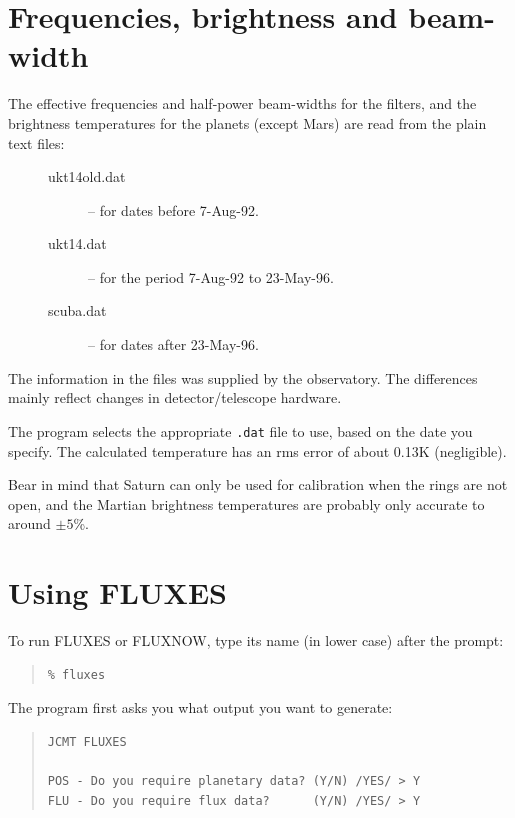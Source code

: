 \documentclass[11pt,twoside]{article}
\newenvironment{myquote}{\begin{quote}\begin{small}}{\end{small}\end{quote}}
\newcommand{\xlabel}[1]{}
\renewcommand{\_}{\texttt{\symbol{95}}}
\begin{document}
\section{Frequencies, brightness and beam-width}
\xlabel{FREQ}
\label{sec:freq}

The effective frequencies and half-power beam-widths for the filters, and the
brightness temperatures for the planets (except Mars) are read from the plain
text files:

\begin{description}
\item[\mbox{}]\mbox{}
\begin{description}
\item [ukt14\_old.dat] -- for dates before 7-Aug-92.
\item [ukt14.dat] -- for the period 7-Aug-92 to 23-May-96.
\item [scuba.dat] -- for dates after 23-May-96.
\end{description}
\end{description}

The information in the files was supplied by the observatory.
The differences mainly reflect changes in detector/telescope hardware.

The program selects the appropriate {\tt{.dat}} file to use, based on the date
you specify.
The calculated temperature has an rms error of about 0.13K (negligible).

Bear in mind that Saturn can only be used for calibration when the
rings are not open, and the Martian brightness temperatures are probably
only accurate to around $\pm5$\%.

\section{Using FLUXES}
\xlabel{USING}
\label{sec:using}

To run FLUXES or FLUXNOW, type its name (in lower case) after the prompt:

\begin{myquote}
\begin{verbatim}
% fluxes
\end{verbatim}
\end{myquote}

The program first asks you what output you want to generate:

\begin{myquote}
\begin{verbatim}
JCMT FLUXES

POS - Do you require planetary data? (Y/N) /YES/ > Y
FLU - Do you require flux data?      (Y/N) /YES/ > Y
\end{verbatim}
\end{myquote}
\end{document}
